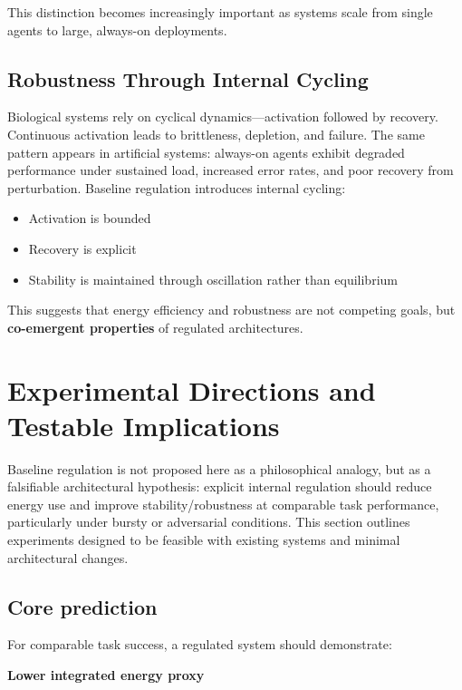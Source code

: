 \documentclass[11pt]{article}
\begin{document}
This distinction becomes increasingly important as systems scale from single agents to large, always-on deployments.

\subsection{Robustness Through Internal Cycling}
Biological systems rely on cyclical dynamics—activation followed by recovery. Continuous activation leads to brittleness, depletion, and failure. The same pattern appears in artificial systems: always-on agents exhibit degraded performance under sustained load, increased error rates, and poor recovery from perturbation. Baseline regulation introduces internal cycling:

\begin{itemize}
\item Activation is bounded
\item Recovery is explicit
\item Stability is maintained through oscillation rather than equilibrium
\end{itemize}

This suggests that energy efficiency and robustness are not competing goals, but \textbf{co-emergent properties} of regulated architectures.

\section{Experimental Directions and Testable Implications}
Baseline regulation is not proposed here as a philosophical analogy, but as a falsifiable architectural hypothesis: explicit internal regulation should reduce energy use and improve stability/robustness at comparable task performance, particularly under bursty or adversarial conditions. This section outlines experiments designed to be feasible with existing systems and minimal architectural changes.

\subsection{Core prediction}
For comparable task success, a regulated system should demonstrate:

\textbf{Lower integrated energy proxy}
\end{document}
